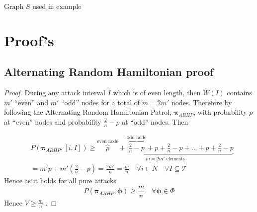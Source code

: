 \documentclass[a4paper,10pt]{article}
\theoremstyle{definition}
\theoremstyle{definition}
\theoremstyle{remark}
\theoremstyle{definition}
\begin{document}
\begin{myfigure}
\begin{center}
\end{center}
\caption{Graph $S$ used in example}
\label{fig: S}
\end{myfigure}

\section{Proof's}

\subsection{Alternating Random Hamiltonian proof}
\label{Alternating Random Hamiltonian proof}

\begin{proof}
During any attack interval $I$ which is of even length, then $W(I)$ contains $m'$ ``even'' and $m'$ ``odd'' nodes for a total of $m=2m'$ nodes. Therefore by following the Alternating Random Hamiltonian Patrol, $\pmb{\pi}_{ARHP}$, with probability $p$ at ``even'' nodes and probability $\frac{2}{n}-p$ at ``odd'' nodes. Then

\begin{align*}
&P(\bm{\pi}_{ARHP},[i,I]) \geq \underbrace{\overbrace{p}^{\text{even node}}+\overbrace{\frac{2}{n}-p}^{\text{odd node}}+p+\frac{2}{n}-p+...+p+\frac{2}{n}-p}_{m=2m' \text{ elements}} \\
&=m' p+m'(\frac{2}{n}-p)=\frac{2m'}{n}=\frac{m}{n} \quad \forall i \in N \quad \forall I \subseteq \mathcal{T}
\end{align*}
Hence as it holds for all pure attacks
$$P(\bm{\pi}_{ARHP},\bm{\phi}) \geq \frac{m}{n} \quad \forall \bm{\phi} \in \Phi$$
Hence $V \geq \frac{m}{n}$ .
\end{proof}
\end{document}
